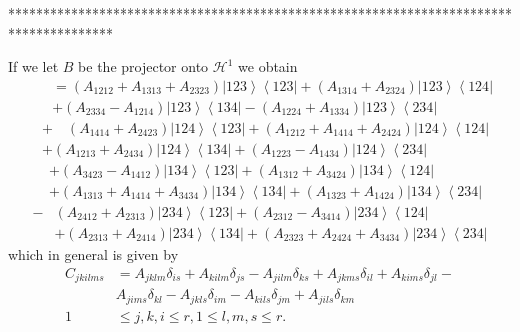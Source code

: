 \documentclass[aps,preprint]{revtex4}%
\begin{document}
***************************************************************************************

If we let $B$ be the projector onto $\mathcal{H}^{1}$ we obtain
\begin{align}
\quad &  =\left(  A_{1212}+A_{1313}+A_{2323}\right)  \left\vert
123\right\rangle \left\langle 123\right\vert +\left(  A_{1314}+A_{2324}%
\right)  \left\vert 123\right\rangle \left\langle 124\right\vert \nonumber\\
&  +\left(  A_{2334}-A_{1214}\right)  \left\vert 123\right\rangle \left\langle
134\right\vert -\left(  A_{1224}+A_{1334}\right)  \left\vert 123\right\rangle
\left\langle 234\right\vert
\end{align}%
\begin{align}
&  +\quad\left(  A_{1414}+A_{2423}\right)  \left\vert 124\right\rangle
\left\langle 123\right\vert +\left(  A_{1212}+A_{1414}+A_{2424}\right)
\left\vert 124\right\rangle \left\langle 124\right\vert \nonumber\\
&  +\left(  A_{1213}+A_{2434}\right)  \left\vert 124\right\rangle \left\langle
134\right\vert +\left(  A_{1223}-A_{1434}\right)  \left\vert 124\right\rangle
\left\langle 234\right\vert
\end{align}%
\begin{align}
&  +\left(  A_{3423}-A_{1412}\right)  \left\vert 134\right\rangle \left\langle
123\right\vert +\left(  A_{1312}+A_{3424}\right)  \left\vert 134\right\rangle
\left\langle 124\right\vert \nonumber\\
&  +\left(  A_{1313}+A_{1414}+A_{3434}\right)  \left\vert 134\right\rangle
\left\langle 134\right\vert +\left(  A_{1323}+A_{1424}\right)  \left\vert
134\right\rangle \left\langle 234\right\vert
\end{align}%
\begin{align}
-  &  \left(  A_{2412}+A_{2313}\right)  \left\vert 234\right\rangle
\left\langle 123\right\vert +\left(  A_{2312}-A_{3414}\right)  \left\vert
234\right\rangle \left\langle 124\right\vert \nonumber\\
&  +\left(  A_{2313}+A_{2414}\right)  \left\vert 234\right\rangle \left\langle
134\right\vert +\left(  A_{2323}+A_{2424}+A_{3434}\right)  \left\vert
234\right\rangle \left\langle 234\right\vert
\end{align}
which in general is given by
\begin{align}
C_{jkilms}  &  =A_{jklm}\delta_{is}+A_{kilm}\delta_{js}-A_{jilm}\delta
_{ks}+A_{jkms}\delta_{il}+A_{kims}\delta_{jl}-\nonumber\\
&  A_{jims}\delta_{kl}-A_{jkls}\delta_{im}-A_{kils}\delta_{jm}+A_{jils}%
\delta_{km}\nonumber\\
1  &  \leq j,k,i\leq r,1\leq l,m,s\leq r.
\end{align}
\end{document}
